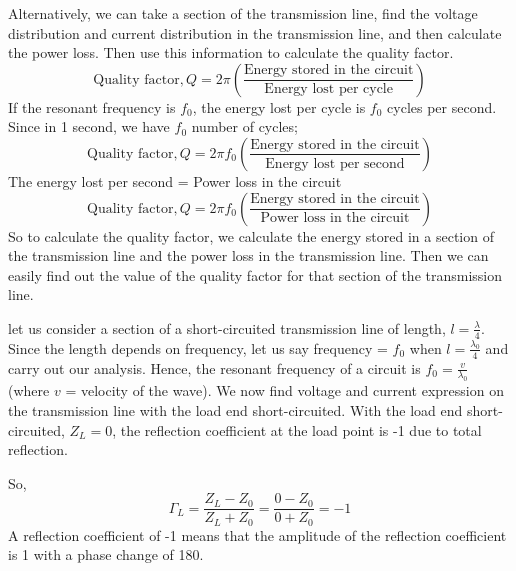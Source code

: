 Alternatively, we can take a section of the transmission line, find the voltage distribution and current distribution in the transmission line, and then calculate the power loss. Then use this information to calculate the quality factor.
\begin{dmath*}
\text{Quality factor},Q 
=2\pi\left(\frac{\text{Energy stored in the circuit}}{\text{Energy lost per cycle}}\right) 
\end{dmath*} 
If the resonant frequency is $ f_0 $, the energy lost per cycle is $ f_0 $ cycles per second. Since in 1 second, we have $ f_0 $ number of cycles;
\begin{dmath*}
\text{Quality factor}, Q = 2\pi f_0\left(\frac{\text{Energy stored in the circuit}}{\text{Energy lost per second}}\right)
\end{dmath*}
The energy lost per second = Power loss in the circuit 
\begin{dmath*}
\text{Quality factor}, Q=2 \pi f_0\left(\frac{\text{Energy stored in the circuit}}{\text{Power loss in the circuit}}\right)
\end{dmath*}
So to calculate the quality factor, we calculate the energy stored in a section of the transmission line and the power loss in the transmission line. Then we can easily find out the value of the quality factor for that section of the transmission line.

let us consider a section of a short-circuited transmission line of length, $ l=\frac{\lambda}{4} $. Since the length depends on frequency, let us say frequency = $ f_0 $ when $ l=\frac{\lambda_{0}}{4}$ and carry out our analysis. Hence, the resonant frequency of a circuit is $ f_0 =\frac{v}{\lambda_{0}}$ (where $v$ = velocity of the wave). We now find voltage and current expression on the transmission line with the load end short-circuited. With the load end short-circuited, $Z_{L}= 0$, the reflection coefficient at the load point is -1 due to total reflection.

So,
\[\Gamma_{L} = \frac{Z_{L} - Z_0}{Z_{L} + Z_0} = \frac{0 - Z_0}{0 + Z_0} = -1\]
A reflection coefficient of -1 means that the amplitude of the reflection coefficient is 1 with a phase change of 180\textdegree.


